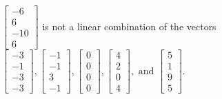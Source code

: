 \begin{exercise}
\begin{exerciseStatement}
  \end{exerciseStatement}
  \begin{exerciseAnswer}
   \(\left[\begin{array}{c}
-6 \\
6 \\
-10 \\
6
\end{array}\right]\) 
  	 is not  
	a linear combination of the vectors \(\left[\begin{array}{c}
-3 \\
-1 \\
-3 \\
-3
\end{array}\right] , \left[\begin{array}{c}
-1 \\
-1 \\
3 \\
-1
\end{array}\right] , \left[\begin{array}{c}
0 \\
0 \\
0 \\
0
\end{array}\right] , \left[\begin{array}{c}
4 \\
2 \\
0 \\
4
\end{array}\right] , \text{ and } \left[\begin{array}{c}
5 \\
1 \\
9 \\
5
\end{array}\right]\).

	
  


  \end{exerciseAnswer}
\end{exercise}